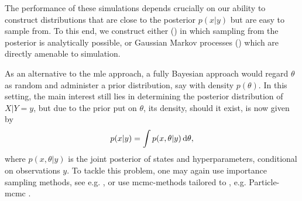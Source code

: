 The performance of these simulations depends crucially on our ability to construct distributions that are close to the posterior $p(x|y)$ but are easy to sample from. To this end, we construct either  () in which sampling from the posterior is analytically possible, or Gaussian Markov processes () which are directly amenable to simulation.

As an alternative to the \acrshort{mle} approach, a fully Bayesian approach would regard $\theta$ as random and administer a prior distribution, say with density $p(\theta)$. In this setting, the main interest still lies in determining the posterior distribution of $X|Y=y$, but due to the prior put on $\theta$, its density, should it exist, is now given by
$$
p(x|y) = \int p(x,\theta|y) \,\mathrm d \theta,
$$
where $p(x,\theta|y)$ is the joint posterior of states and hyperparameters, conditional on observations $y$. To tackle this problem, one may again use importance sampling methods, see e.g. \citep[Chapter 13.1]{Durbin2012Time}, or use \acrshort{mcmc}-methods tailored to , e.g. Particle-\acrshort{mcmc} \citep[Chapter 16]{Chopin2020Introduction}.






%

